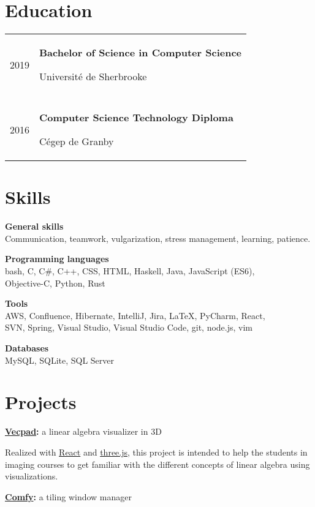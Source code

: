 \documentclass{article}
\newcommand{\separation}{\multicolumn{1}{c}{} \\}
\begin{document}
	\section{Education}
	\begin{tabu} to \textwidth {r|X}
		2019 & {
			{\large \bfseries Bachelor of Science in Computer Science}

			Université de Sherbrooke
		} \\

		\separation{}
		2016 & {
			{\large \bfseries Computer Science Technology Diploma}

			Cégep de Granby
		} \\
	\end{tabu}

	\section{Skills}

	\textbf{General skills} \\
	Communication, teamwork, vulgarization, stress management, learning, patience.

	\textbf{Programming languages} \\
	{\ttfamily bash, C, C\#, C++, CSS, HTML, Haskell, Java, JavaScript (ES6), \\ Objective-C, Python, Rust}

	\textbf{Tools} \\
	{\ttfamily AWS, Confluence, Hibernate, IntelliJ, Jira,} \LaTeX{\ttfamily , PyCharm, React, \\ SVN, Spring, Visual Studio, Visual Studio Code, git, node.js, vim}

	\textbf{Databases} \\
	{\ttfamily MySQL, SQLite, SQL Server}

	\section{Projects}
	{\large \bfseries \href{https://vecpad.netlify.com/}{Vecpad}:}
	{\large a linear algebra visualizer in 3D}

	Realized with \href{https://reactjs.org/}{React} and \href{https://threejs.org/}{three.js}, this project is intended to help the students in imaging courses to get familiar with the different concepts of linear algebra using visualizations.

	\bigskip
	{\large \bfseries \href{https://github.com/daniel-junior-dube/comfywm}{Comfy}:}
	{\large a tiling window manager}
\end{document}
